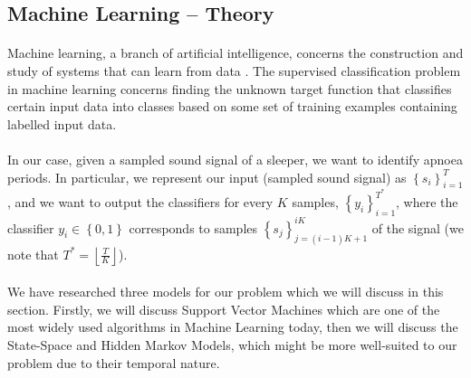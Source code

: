\subsection{Machine Learning -- Theory}

\paragraph{}
	Machine learning, a branch of artificial intelligence, concerns the construction and study of systems that can learn from data \cite{wiki:machineLearning}. The supervised classification problem in machine learning concerns finding the unknown target function that classifies certain input data into classes based on some set of training examples containing labelled input data.
	
\paragraph{}
	In our case, given a sampled sound signal of a sleeper, we want to identify apnoea periods. In particular, we represent our input (sampled sound signal) as $\left\{ s_i \right\}_{i = 1}^{T}$, and we want to output the classifiers for every $K$ samples, $\left\{ y_i \right\}_{i = 1}^{T^\ast}$, where the classifier $y_i \in \left\{0, 1\right\}$ corresponds to samples $\left\{ s_j \right\}_{j = \left(i - 1\right)K + 1}^{iK}$ of the signal (we note that $T^\ast = \left\lfloor\frac{T}{K}\right\rfloor$).
	
\paragraph{}
	We have researched three models for our problem which we will discuss in this section. Firstly, we will discuss Support Vector Machines which are one of the most widely used algorithms in Machine Learning today, then we will discuss the State-Space and Hidden Markov Models, which might be more well-suited to our problem due to their temporal nature.
	



